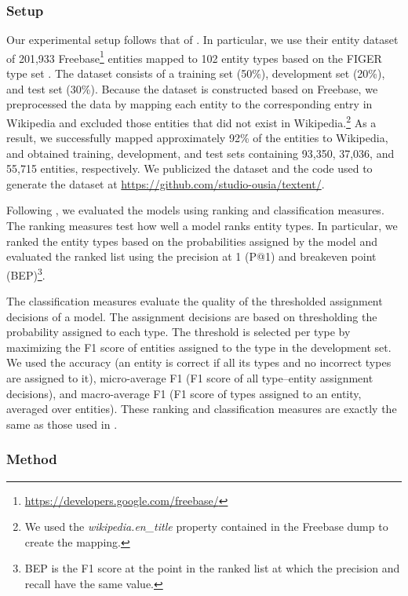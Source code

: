 \documentclass[11pt]{article}
\begin{document}
  \subsubsection*{Setup}

  Our experimental setup follows that of .
  In particular, we use their entity dataset of 201,933 Freebase\footnote{\url{https://developers.google.com/freebase/}} entities mapped to 102 entity types based on the FIGER type set \cite{Ling2012}.
  The dataset consists of a training set (50\%), development set (20\%), and test set (30\%).
  Because the dataset is constructed based on Freebase, we preprocessed the data by mapping each entity to the corresponding entry in Wikipedia and excluded those entities that did not exist in Wikipedia.\footnote{We used the \textit{wikipedia.en\_title} property contained in the Freebase dump to create the mapping.}
  As a result, we successfully mapped approximately 92\% of the entities to Wikipedia, and obtained training, development, and test sets containing 93,350, 37,036, and 55,715 entities, respectively.
  We publicized the dataset and the code used to generate the dataset at \url{https://github.com/studio-ousia/textent/}.

  Following , we evaluated the models using ranking and classification measures.
  The ranking measures test how well a model ranks entity types.
  In particular, we ranked the entity types based on the probabilities assigned by the model and evaluated the ranked list using the precision at 1 (P@1) and breakeven point (BEP)\footnote{BEP is the F1 score at the point in the ranked list at which the precision and recall have the same value.}.

  The classification measures evaluate the quality of the thresholded assignment decisions of a model.
  The assignment decisions are based on thresholding the probability assigned to each type.
  The threshold is selected per type by maximizing the F1 score of entities assigned to the type in the development set.
  We used the accuracy (an entity is correct if all its types and no incorrect types are assigned to it), micro-average F1 (F1 score of all type--entity assignment decisions), and macro-average F1 (F1 score of types assigned to an entity, averaged over entities).
  These ranking and classification measures are exactly the same as those used in .

  \subsubsection*{Method}
\end{document}
